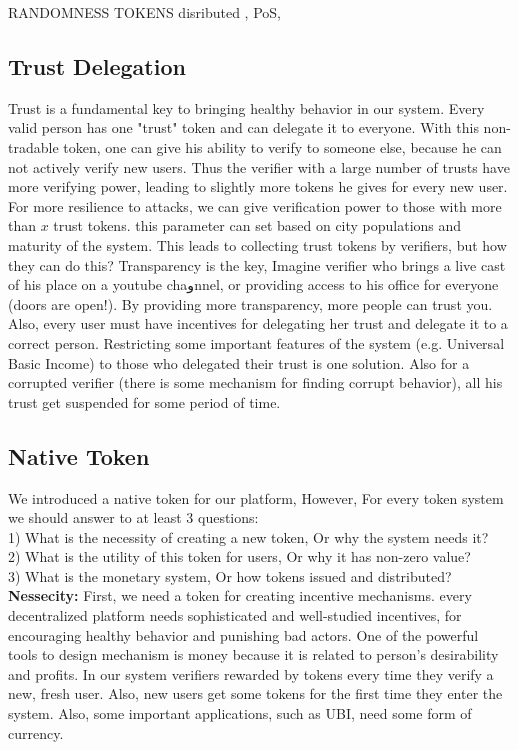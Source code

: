 \documentclass[conference]{IEEEtran}
\begin{document}
RANDOMNESS TOKENS disributed , PoS, 

\subsection{Trust Delegation}
Trust is a fundamental key to bringing healthy behavior in our system. Every valid person has one "trust" token and can delegate it to everyone. With this non-tradable token, one can give his ability to verify to someone else, because he can not actively verify new users. Thus the verifier with a large number of trusts have more verifying power, leading to slightly more tokens he gives for every new user.
\\
For more resilience to attacks, we can give verification power to those with more than $x$ trust tokens. this parameter can set based on city populations and maturity of the system. This leads to collecting trust tokens by verifiers, but how they can do this? Transparency is the key, Imagine verifier who brings a live cast of his place on a youtube chaوnnel, or providing access to his office for everyone (doors are open!). By providing more transparency, more people can trust you.
\\
Also, every user must have incentives for delegating her trust and delegate it to a correct person. Restricting some important features of the system (e.g. Universal Basic Income) to those who delegated their trust is one solution. Also for a corrupted verifier (there is some mechanism for finding corrupt behavior), all his trust get suspended for some period of time.




\subsection{Native Token}
We introduced a native token for our platform, However, For every  token system we should answer to at least 3 questions:
\\
1) What is the necessity of creating a new token, Or why the system needs it?
\\
2) What is the utility of this token for users, Or why it has non-zero value?
\\
3) What is the monetary system, Or how tokens issued and distributed?
\\

\textbf{Nessecity:} First, we need a token for creating incentive mechanisms. every decentralized platform needs sophisticated and well-studied incentives, for encouraging healthy behavior and punishing bad actors. One of the powerful tools to design mechanism is money because it is related to person's desirability and profits. In our system verifiers rewarded by tokens every time they verify a new, fresh user. Also, new users get some tokens for the first time they enter the system. Also, some important applications, such as UBI, need some form of currency.
\\
\end{document}
